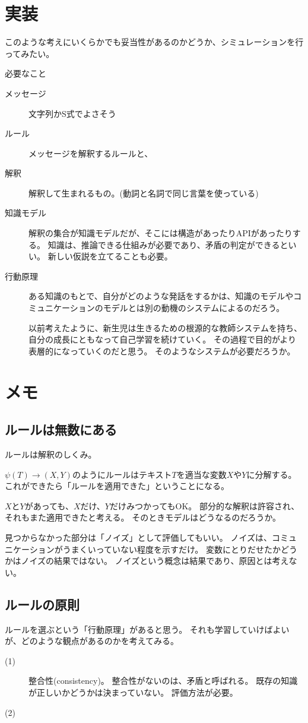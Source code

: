\documentclass[10pt, oneside]{jarticle}   	%
\begin{document}
\section{実装}
このような考えにいくらかでも妥当性があるのかどうか、シミュレーションを行ってみたい。

必要なこと
\begin{description}
\item[ メッセージ] 文字列かS式でよさそう
\item[ ルール]メッセージを解釈するルールと、
\item[ 解釈]解釈して生まれるもの。(動詞と名詞で同じ言葉を使っている)
\item[ 知識モデル] 解釈の集合が知識モデルだが、そこには構造があったりAPIがあったりする。
知識は、推論できる仕組みが必要であり、矛盾の判定ができるといい。
新しい仮説を立てることも必要。
\item[ 行動原理]ある知識のもとで、自分がどのような発話をするかは、知識のモデルやコミュニケーションのモデルとは別の動機のシステムによるのだろう。

以前考えたように、新生児は生きるための根源的な教師システムを持ち、自分の成長にともなって自己学習を続けていく。
その過程で目的がより表層的になっていくのだと思う。
そのようなシステムが必要だろうか。
\end{description}

\section{メモ}
\subsection{ルールは無数にある}
ルールは解釈のしくみ。

$\psi(T) \to (X,Y)$のようにルールはテキスト$T$を適当な変数$X$や$Y$に分解する。
これができたら「ルールを適用できた」ということになる。

$X$と$Y$があっても、$X$だけ、$Y$だけみつかってもOK。
部分的な解釈は許容され、それもまた適用できたと考える。
そのときモデルはどうなるのだろうか。

見つからなかった部分は「ノイズ」として評価してもいい。
ノイズは、コミュニケーションがうまくいっていない程度を示すだけ。
変数にとりだせたかどうかはノイズの結果ではない。
ノイズという概念は結果であり、原因とは考えない。

\subsection{ルールの原則}
ルールを選ぶという「行動原理」があると思う。
それも学習していけばよいが、どのような観点があるのかを考えてみる。
\begin{description}
\item[ (1)] 整合性(consistency)。 整合性がないのは、矛盾と呼ばれる。
既存の知識が正しいかどうかは決まっていない。
評価方法が必要。
\item[ (2)]

\end{description}
\end{document}
